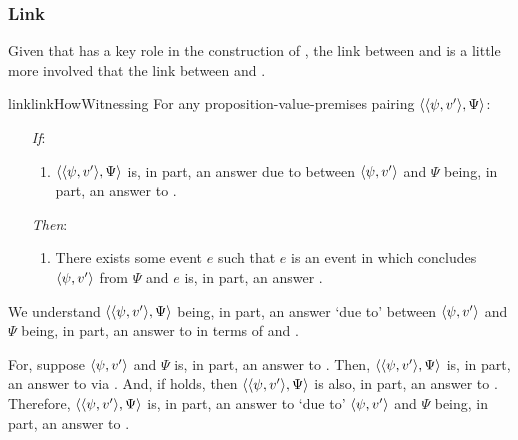 \subsubsection{Link}
\label{cha:var:sec:vars:qhowv:sec:link}

\begin{note}
  Given that \qWhyV{} has a key role in the construction of \qHowV{}, the link between \qHow{} and \qHowV{} is a little more involved that the link between \qWhyV{} and \qWhy{}.

  \begin{restatable}{link}{linkHowWitnessing}
    \label{link:how-witnessing}
    For any proposition-value-premises pairing \(\langle \langle \psi, v' \rangle, \Psi \rangle\):
    \begin{itemize}
    \item[\emph{If}:]
      \begin{enumerate}[label=\alph*., ref=(\alph*)]
      \item
        \(\langle \langle \psi, v' \rangle, \Psi \rangle\) is, in part, an answer \qHow{} due to \ros{} between \(\langle \psi, v' \rangle\) and \(\Psi\) being, in part, an answer to \qWhyV{}.
      \end{enumerate}
    \item[\emph{Then}:]
      \begin{enumerate}[label=\alph*., ref=(\alph*), resume]
      \item
        There exists some event \(e\) such that \(e\) is an event in which \vAgent{} concludes \(\langle \psi, v' \rangle\) from \(\Psi\) and \(e\) is, in part, an answer \qHowV{}.
      \end{enumerate}
    \end{itemize}
    \vspace{-\baselineskip}
  \end{restatable}

  We understand  \(\langle \langle \psi, v' \rangle, \Psi \rangle\) being, in part, an answer \qHow{} `due to' \ros{} between \(\langle \psi, v' \rangle\) and \(\Psi\) being, in part, an answer to \qWhyV{} in terms of \linkW{} and \issueInclusion{}.

  For, suppose \(\langle \psi, v' \rangle\) and \(\Psi\) is, in part, an answer to \qWhyV{}.
  Then, \(\langle \langle \psi, v' \rangle, \Psi \rangle\) is, in part, an answer to \qWhy{} via \linkW{}.
  And, if \issueInclusion{} holds, then \(\langle \langle \psi, v' \rangle, \Psi \rangle\) is also, in part, an answer to \qHow{}.
  Therefore, \(\langle \langle \psi, v' \rangle, \Psi \rangle\) is, in part, an answer to \qHow{} `due to' \(\langle \psi, v' \rangle\) and \(\Psi\) being, in part, an answer to \qWhyV{}.
\end{note}

